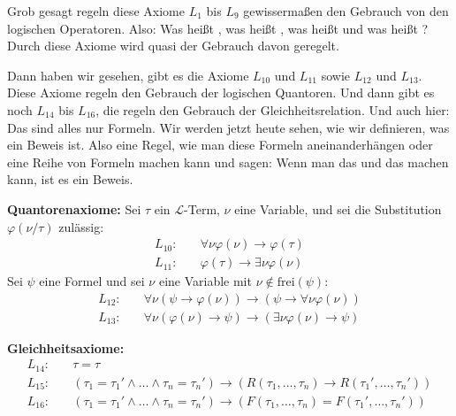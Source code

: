 \begin{spoken-clean}[00:06:45 - 00:09:00]
Grob gesagt regeln diese Axiome $L_1$ bis $L_9$ gewissermaßen den Gebrauch von den logischen Operatoren. Also: Was heißt , was heißt , was heißt  und was heißt ? Durch diese Axiome wird quasi der Gebrauch davon geregelt.

Dann haben wir gesehen, gibt es die Axiome $L_{10}$ und $L_{11}$ sowie $L_{12}$ und $L_{13}$. Diese Axiome regeln den Gebrauch der logischen Quantoren. Und dann gibt es noch $L_{14}$ bis $L_{16}$, die regeln den Gebrauch der Gleichheitsrelation. Und auch hier: Das sind alles nur Formeln. Wir werden jetzt heute sehen, wie wir definieren, was ein Beweis ist. Also eine Regel, wie man diese Formeln aneinanderhängen oder eine Reihe von Formeln machen kann und sagen: Wenn man das und das machen kann, ist es ein Beweis.
\end{spoken-clean}

\begin{math-stroke}
\textbf{Quantorenaxiome:}
Sei $\tau$ ein $\mathcal{L}$-Term, $\nu$ eine Variable, und sei die Substitution $\varphi(\nu/\tau)$ zulässig:
\begin{align}
    L_{10}: &\quad \forall \nu \varphi(\nu) \rightarrow \varphi(\tau) \nonumber \\
    L_{11}: &\quad \varphi(\tau) \rightarrow \exists \nu \varphi(\nu) \nonumber
\end{align}
Sei $\psi$ eine Formel und sei $\nu$ eine Variable mit $\nu \notin \text{frei}(\psi)$:
\begin{align}
    L_{12}: &\quad \forall \nu (\psi \rightarrow \varphi(\nu)) \rightarrow (\psi \rightarrow \forall \nu \varphi(\nu)) \nonumber \\
    L_{13}: &\quad \forall \nu (\varphi(\nu) \rightarrow \psi) \rightarrow (\exists \nu \varphi(\nu) \rightarrow \psi) \nonumber
\end{align}

\textbf{Gleichheitsaxiome:}
\begin{align}
    L_{14}: &\quad \tau = \tau \nonumber \\
    L_{15}: &\quad (\tau_1 = \tau_1' \wedge \dots\wedge \tau_n = \tau_n') \rightarrow (R(\tau_1, \dots, \tau_n) \rightarrow R(\tau_1', \dots, \tau_n')) \nonumber \\
    L_{16}: &\quad (\tau_1 = \tau_1' \wedge \dots \wedge \tau_n = \tau_n') \rightarrow (F(\tau_1, \dots, \tau_n) = F(\tau_1', \dots, \tau_n')) \nonumber
\end{align}
\end{math-stroke}

